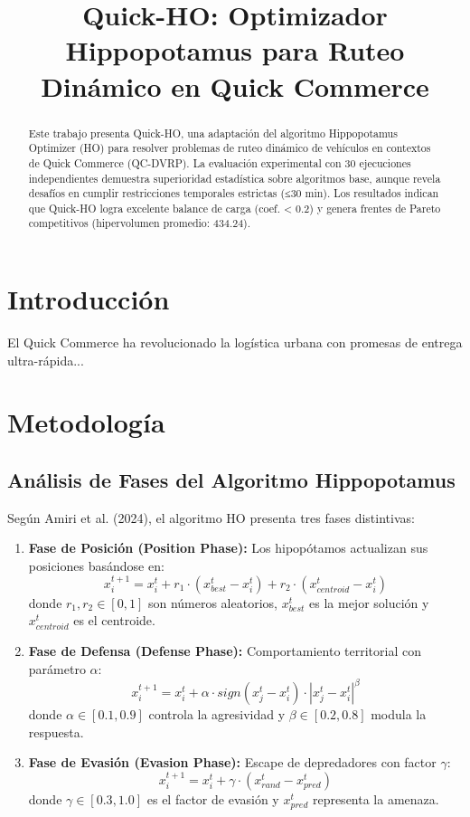 \documentclass[conference]{IEEEtran}
\title{Quick-HO: Optimizador Hippopotamus para Ruteo Dinámico en Quick Commerce}
\author{\IEEEauthorblockN{Autor 1, Autor 2}
\IEEEauthorblockA{Universidad\\
Email: autor@universidad.edu}}
\begin{document}
\maketitle

\begin{abstract}
Este trabajo presenta Quick-HO, una adaptación del algoritmo Hippopotamus Optimizer (HO) para resolver problemas de ruteo dinámico de vehículos en contextos de Quick Commerce (QC-DVRP). La evaluación experimental con 30 ejecuciones independientes demuestra superioridad estadística sobre algoritmos base, aunque revela desafíos en cumplir restricciones temporales estrictas (≤30 min). Los resultados indican que Quick-HO logra excelente balance de carga (coef. < 0.2) y genera frentes de Pareto competitivos (hipervolumen promedio: 434.24).
\end{abstract}

\section{Introducción}
El Quick Commerce ha revolucionado la logística urbana con promesas de entrega ultra-rápida...

\section{Metodología}
\subsection{Análisis de Fases del Algoritmo Hippopotamus}

Según Amiri et al. (2024), el algoritmo HO presenta tres fases distintivas:

\begin{enumerate}
\item \textbf{Fase de Posición (Position Phase):} Los hipopótamos actualizan sus posiciones basándose en:
\begin{equation}
x_i^{t+1} = x_i^t + r_1 \cdot (x_{best}^t - x_i^t) + r_2 \cdot (x_{centroid}^t - x_i^t)
\end{equation}
donde $r_1, r_2 \in [0,1]$ son números aleatorios, $x_{best}^t$ es la mejor solución y $x_{centroid}^t$ es el centroide.

\item \textbf{Fase de Defensa (Defense Phase):} Comportamiento territorial con parámetro $\alpha$:
\begin{equation}
x_i^{t+1} = x_i^t + \alpha \cdot sign(x_j^t - x_i^t) \cdot |x_j^t - x_i^t|^{\beta}
\end{equation}
donde $\alpha \in [0.1, 0.9]$ controla la agresividad y $\beta \in [0.2, 0.8]$ modula la respuesta.

\item \textbf{Fase de Evasión (Evasion Phase):} Escape de depredadores con factor $\gamma$:
\begin{equation}
x_i^{t+1} = x_i^t + \gamma \cdot (x_{rand}^t - x_{pred}^t)
\end{equation}
donde $\gamma \in [0.3, 1.0]$ es el factor de evasión y $x_{pred}^t$ representa la amenaza.
\end{enumerate}
\end{document}
